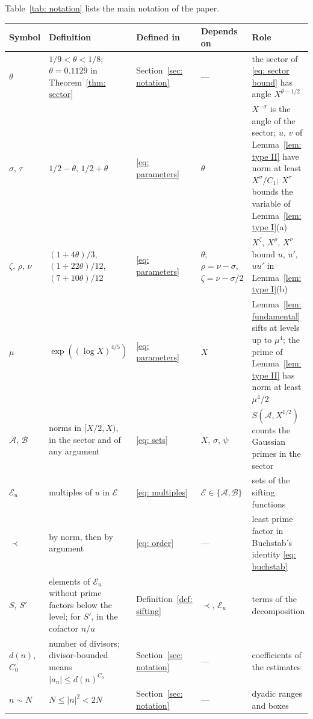 \documentclass{article}
\numberwithin{equation}{section}
\newcommand{\Le}{\leqslant}
\begin{document}
Table~\ref{tab: notation} lists the main notation of the paper.

\begin{table}[!htbp]
\centering
\footnotesize
\setlength{\tabcolsep}{4pt}
\begin{tabular}{p{2.1cm}p{3.7cm}p{2.3cm}p{2.4cm}p{4.5cm}}
\toprule
Symbol & Definition & Defined in & Depends on & Role \\
\midrule
$\theta$ & $1/9 < \theta < 1/8$; $\theta = 0.1129$ in Theorem~\ref{thm: sector} & Section~\ref{sec: notation} & --- & the sector of \eqref{eq: sector bound} has angle $X^{\theta - 1/2}$ \\
$\sigma$, $\tau$ & $1/2 - \theta$, $1/2 + \theta$ & \eqref{eq: parameters} & $\theta$ & $X^{-\sigma}$ is the angle of the sector; $u$, $v$ of Lemma~\ref{lem: type II} have norm at least $X^{\sigma}/C_1$; $X^{\tau}$ bounds the variable of Lemma~\ref{lem: type I}(a) \\
$\zeta$, $\rho$, $\nu$ & $(1 + 4\theta)/3$, $(1 + 22\theta)/12$, $(7 + 10\theta)/12$ & \eqref{eq: parameters} & $\theta$; $\rho = \nu - \sigma$, $\zeta = \nu - \sigma/2$ & $X^{\zeta}$, $X^{\rho}$, $X^{\nu}$ bound $u$, $u'$, $uu'$ in Lemma~\ref{lem: type I}(b) \\
$\mu$ & $\exp((\log X)^{4/5})$ & \eqref{eq: parameters} & $X$ & Lemma~\ref{lem: fundamental} sifts at levels up to $\mu^4$; the prime of Lemma~\ref{lem: type II} has norm at least $\mu^4/2$ \\
$\mathcal{A}$, $\mathcal{B}$ & norms in $[X/2, X)$, in the sector and of any argument & \eqref{eq: sets} & $X$, $\sigma$, $\psi$ & $S(\mathcal{A}, X^{1/2})$ counts the Gaussian primes in the sector \\
$\mathcal{E}_u$ & multiples of $u$ in $\mathcal{E}$ & \eqref{eq: multiples} & $\mathcal{E} \in \{\mathcal{A}, \mathcal{B}\}$ & sets of the sifting functions \\
$\prec$ & by norm, then by argument & \eqref{eq: order} & --- & least prime factor in Buchstab's identity \eqref{eq: buchstab} \\
$S$, $S'$ & elements of $\mathcal{E}_u$ without prime factors below the level; for $S'$, in the cofactor $n/u$ & Definition~\ref{def: sifting} & $\prec$, $\mathcal{E}_u$ & terms of the decomposition \\
$d(n)$, $C_0$ & number of divisors; divisor-bounded means $|a_n| \Le d(n)^{C_0}$ & Section~\ref{sec: notation} & --- & coefficients of the estimates \\
$n \sim N$ & $N \Le |n|^2 < 2N$ & Section~\ref{sec: notation} & --- & dyadic ranges and boxes \\

\end{tabular}
\end{table}
\end{document}

